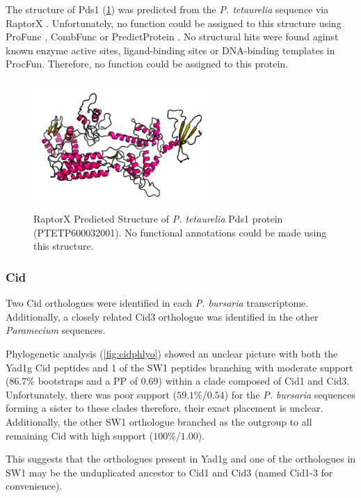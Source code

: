 The structure of Pds1 (\cref{fig:pds1_struct}) was predicted 
from the \textit{P. tetaurelia}
sequence via RaptorX \citep{Kallberg2012}.  Unfortunately,
no function could be assigned to this structure using ProFunc \citep{Laskowski2005},
CombFunc \citep{Wass2012} or PredictProtein \citep{Rost2004}.
No structural hits were found aginst known enzyme active sites, ligand-binding
sites or DNA-binding templates in ProcFun.
Therefore, no function could be assigned to this protein.

\begin{figure}
    \centering
    \includegraphics[width=0.6\textwidth]{psd1_struct.png}
    \caption[Predicted Structure of Pds1]{RaptorX Predicted Structure of \textit{P. tetaurelia}
    Pds1 protein (PTETP600032001). No functional annotations could be made using this structure.}
    \label{fig:pds1_struct}
\end{figure}

\subsubsection{Cid}

Two Cid orthologues were identified in each \textit{P. bursaria}
transcriptome.  Additionally, a closely related Cid3 orthologue
was identified in the other \textit{Paramecium} sequences.

Phylogenetic analysis (\cref{fig:cidphlyo}) showed an unclear
picture with both the Yad1g Cid peptides and 1 of the SW1 peptides
branching with moderate support (\(86.7\%\) bootstraps and
a PP of \(0.69\)) within a 
clade composed of Cid1 and Cid3.  Unfortunately, there was
poor support (\(59.1\%\)/\(0.54\)) for the \textit{P. bursaria}
sequences forming a sister to these clades therefore,
their exact placement is unclear.
Additionally, the other
SW1 orthologue branched as the outgroup to all remaining Cid
with high support (\(100\%\)/\(1.00\)). 

This suggests that the orthologues present in Yad1g and one of
the orthologues in SW1 may be the unduplicated ancestor
to Cid1 and Cid3 (named Cid1-3 for convenience).


